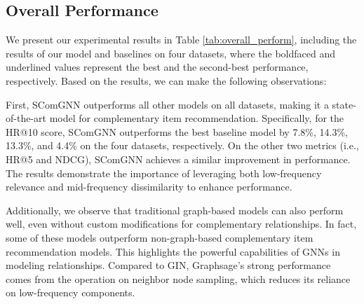 \documentclass[letterpaper]{article} %
\begin{document}
\subsection{Overall Performance}
We present our experimental results in Table \ref{tab:overall_perform}, including the results of our model and baselines on four datasets, where the boldfaced and underlined values represent the best and the second-best performance, respectively. Based on the results, we can make the following observations:

First, SComGNN outperforms all other models on all datasets, making it a state-of-the-art model for complementary item recommendation. Specifically, for the HR@10 score, SComGNN outperforms the best baseline model by 7.8\%, 14.3\%, 13.3\%, and 4.4\% on the four datasets, respectively. On the other two metrics (i.e., HR@5 and NDCG), SComGNN achieves a similar improvement in performance. The results demonstrate the importance of leveraging both low-frequency relevance and mid-frequency dissimilarity to enhance performance.

Additionally, we observe that traditional graph-based models can also perform well, even without custom modifications for complementary relationships. In fact, some of these models outperform non-graph-based complementary item recommendation models. This highlights the powerful capabilities of GNNs in modeling relationships. Compared to GIN, Graphsage's strong performance comes from the operation on neighbor node sampling, which reduces its reliance on low-frequency components.
\end{document}
